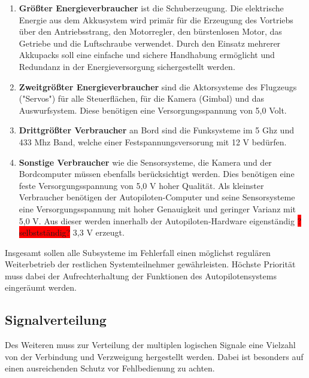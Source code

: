 \begin{enumerate}
    \item \textbf{Größter Energieverbraucher} ist die Schuberzeugung. Die elektrische Energie aus dem Akkusystem wird primär für die Erzeugung des Vortriebs über den Antriebsstrang, den Motorregler, den bürstenlosen Motor, das Getriebe und die Luftschraube verwendet. Durch den Einsatz mehrerer Akkupacks soll eine einfache und sichere Handhabung ermöglicht und Redundanz in der Energieversorgung sichergestellt werden.
    \begin{comment}??? In diesem Pfad soll die Verwendung mehrerer Quellen (Akkupacks) bei sicherer Handhabung ermöglicht werden. ???\end{comment}
    
    \item \textbf{Zweitgrößter Energieverbraucher} sind die Aktorsysteme des Flugzeugs ("Servos") für alle Steuerflächen, für die Kamera (Gimbal) und das Auswurfsystem. Diese benötigen eine Versorgungsspannung von 5,0 Volt.
    
    \item \textbf{Drittgrößter Verbraucher} an Bord sind die Funksysteme im 5 Ghz und 433 Mhz Band, welche einer Festspannungsversorung mit 12 V  bedürfen.

    \item \textbf{Sonstige Verbraucher} wie die Sensorsysteme, die Kamera und der Bordcomputer müssen ebenfalls berücksichtigt werden. Dies benötigen eine feste Versorgungsspannung von 5,0 V hoher Qualität. Als kleinster Verbraucher benötigen der Autopiloten-Computer und seine Sensorsysteme eine Versorgungsspannung mit hoher Genauigkeit und geringer Varianz mit 5,0 V. Aus dieser werden innerhalb der Autopiloten-Hardware eigenständig  \colorbox{red}{?selbstständig?} 3,3 V erzeugt.
\end{enumerate}

Insgesamt sollen alle Subsysteme im Fehlerfall einen möglichst regulären Weiterbetrieb der restlichen Systemteilnehmer gewährleisten. Höchste Priorität muss dabei der Aufrechterhaltung der Funktionen des Autopilotensystems eingeräumt werden.


\subsection{Signalverteilung}

Des Weiteren muss zur Verteilung der multiplen logischen Signale eine Vielzahl von der Verbindung und Verzweigung hergestellt werden. Dabei ist besonders auf einen ausreichenden Schutz vor Fehlbedienung zu achten.


